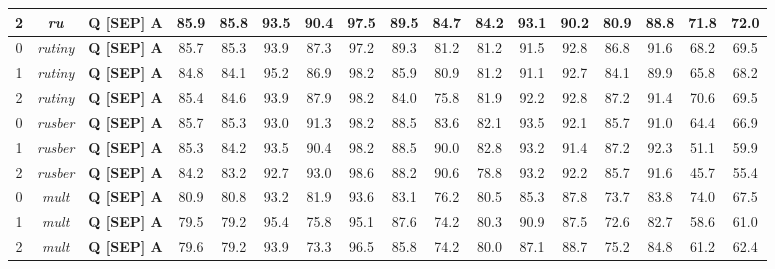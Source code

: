 \begin{table}[]
{\begin{tabular}{|c|c||c|c|c|c|c|c|c|c|c|c|c|c|c|c|c|}
2 & \textit{ru} &  \textbf{Q [SEP] A} & 85.9 & 85.8 & 93.5 & 90.4 & 97.5 & 89.5 & 84.7 & 84.2 & 93.1 & 90.2 & 80.9 & 88.8 & 71.8 & 72.0\\ \hline
0 & \textit{rutiny} &  \textbf{Q [SEP] A} & 85.7 & 85.3 & 93.9 & 87.3 & 97.2 & 89.3 & 81.2 & 81.2 & 91.5 & 92.8 & 86.8 & 91.6 & 68.2 & 69.5\\ \hline
1 & \textit{rutiny} &  \textbf{Q [SEP] A} & 84.8 & 84.1 & 95.2 & 86.9 & 98.2 & 85.9 & 80.9 & 81.2 & 91.1 & 92.7 & 84.1 & 89.9 & 65.8 & 68.2\\ \hline
2 & \textit{rutiny} &  \textbf{Q [SEP] A} & 85.4 & 84.6 & 93.9 & 87.9 & 98.2 & 84.0 & 75.8 & 81.9 & 92.2 & 92.8 & 87.2 & 91.4 & 70.6 & 69.5\\ \hline
0 & \textit{rusber} &  \textbf{Q [SEP] A} & 85.7 & 85.3 & 93.0 & 91.3 & 98.2 & 88.5 & 83.6 & 82.1 & 93.5 & 92.1 & 85.7 & 91.0 & 64.4 & 66.9\\ \hline
1 & \textit{rusber} &  \textbf{Q [SEP] A} & 85.3 & 84.2 & 93.5 & 90.4 & 98.2 & 88.5 & 90.0 & 82.8 & 93.2 & 91.4 & 87.2 & 92.3 & 51.1 & 59.9\\ \hline
2 & \textit{rusber} &  \textbf{Q [SEP] A} & 84.2 & 83.2 & 92.7 & 93.0 & 98.6 & 88.2 & 90.6 & 78.8 & 93.2 & 92.2 & 85.7 & 91.6 & 45.7 & 55.4\\ \hline
0 & \textit{mult} &  \textbf{Q [SEP] A} & 80.9 & 80.8 & 93.2 & 81.9 & 93.6 & 83.1 & 76.2 & 80.5 & 85.3 & 87.8 & 73.7 & 83.8 & 74.0 & 67.5\\ \hline
1 & \textit{mult} &  \textbf{Q [SEP] A} & 79.5 & 79.2 & 95.4 & 75.8 & 95.1 & 87.6 & 74.2 & 80.3 & 90.9 & 87.5 & 72.6 & 82.7 & 58.6 & 61.0\\ \hline
2 & \textit{mult} &  \textbf{Q [SEP] A} & 79.6 & 79.2 & 93.9 & 73.3 & 96.5 & 85.8 & 74.2 & 80.0 & 87.1 & 88.7 & 75.2 & 84.8 & 61.2 & 62.4\\ \hline
\end{tabular}}
\end{table}

